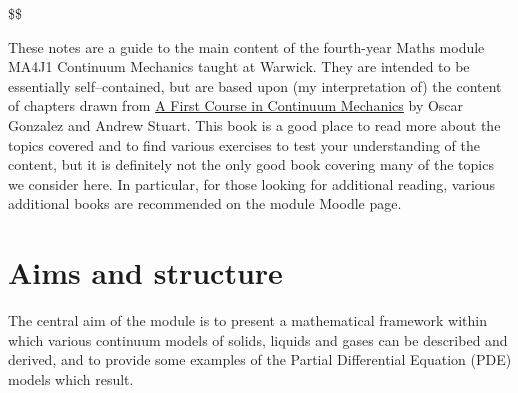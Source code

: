 \documentclass[
  letterpaper,
  DIV=11,
  numbers=noendperiod]{scrreprt}
\theoremstyle{plain}
\theoremstyle{remark}
\begin{document}
\newcommand{\bftau}{{\boldsymbol{\tau}}}
\newcommand{\bfnu}{{\boldsymbol{\nu}}}
\newcommand{\bfpsi}{{\boldsymbol{\psi}}}
\newcommand{\bfphi}{{\boldsymbol{\varphi}}}
\newcommand{\bfSigma}{{\boldsymbol{\Sigma}}}
\newcommand{\calI}{{\mathcal{I}}}
\newcommand{\calN}{{\mathcal{N}}}
\newcommand{\calV}{{\mathcal{V}}}
\newcommand{\bbE}{{\mathbb{E}}}
\newcommand{\bbR}{{\mathbb{R}}}
\newcommand{\bbC}{{\mathbb{C}}}
\newcommand{\bsfC}{{\mathsf{C}}}
\newcommand{\bsfD}{{\mathsf{D}}}
\newcommand{\bsfI}{{\mathsf{I}}}
\newcommand{\bsfO}{{\mathsf{O}}}
\newcommand{\tr}{{\operatorname{tr}}}
\newcommand{\sym}{{\operatorname{sym}}}
\newcommand{\skw}{{\operatorname{skew}}}
\newcommand{\vc}{{\operatorname{vec}}}
\newcommand{\ten}{{\operatorname{ten}}}
\newcommand{\cof}{{\operatorname{cof}}}
\newcommand{\mass}{{\operatorname{mass}}}
\newcommand{\vol}{{\operatorname{vol}}}
\newcommand{\area}{{\operatorname{area}}}
\newcommand{\com}{{\operatorname{com}}}
\newcommand{\cov}{{\operatorname{cov}}}
\newcommand{\e}{{\mathrm{e}}}
\newcommand{\D}{{\mathrm{D}}}
\newcommand{\d}{{\mathrm{d}}}
\newcommand{\dt}{{\d t}}
\newcommand{\Dt}{{\D t}}
\newcommand{\bigO}{{O}}
\newcommand{\litO}{{o}}
\newcommand{\dVx}{{\,\d V_{\bfx}}}
\newcommand{\dAx}{{\,\d A_{\bfx}}}
\newcommand{\dVy}{{\,\d V_{\bfy}}}
\newcommand{\dAy}{{\,\d A_{\bfy}}}
\newcommand{\ds}{{\,\d s}}

\$\$

These notes are a guide to the main content of the fourth-year Maths
module MA4J1 Continuum Mechanics taught at Warwick. They are intended to
be essentially self--contained, but are based upon (my interpretation
of) the content of chapters drawn from
\href{https://go.exlibris.link/CMjyhLvJ}{A First Course in Continuum
Mechanics} by Oscar Gonzalez and Andrew Stuart. This book is a good
place to read more about the topics covered and to find various
exercises to test your understanding of the content, but it is
definitely not the only good book covering many of the topics we
consider here. In particular, for those looking for additional reading,
various additional books are recommended on the module Moodle page.

\section*{Aims and structure}\label{aims-and-structure}


The central aim of the module is to present a mathematical framework
within which various continuum models of solids, liquids and gases can
be described and derived, and to provide some examples of the Partial
Differential Equation (PDE) models which result.
\end{document}
